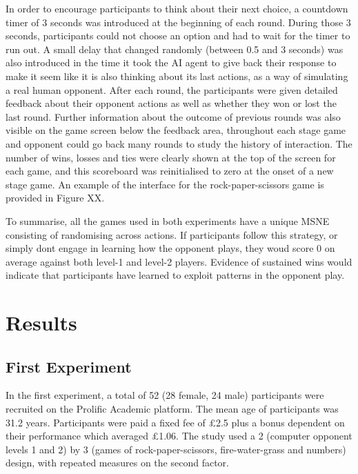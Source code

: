 \documentclass[,man,floatsintext]{apa6}
\begin{document}
In order to encourage participants to think about their next choice, a countdown timer of 3 seconds was introduced at the beginning of each round. During those 3 seconds, participants could not choose an option and had to wait for the timer to run out. A small delay that changed randomly (between 0.5 and 3 seconds) was also introduced in the time it took the AI agent to give back their response to make it seem like it is also thinking about its last actions, as a way of simulating a real human opponent. After each round, the participants were given detailed feedback about their opponent actions as well as whether they won or lost the last round. Further information about the outcome of previous rounds was also visible on the game screen below the feedback area, throughout each stage game and opponent could go back many rounds to study the history of interaction. The number of wins, losses and ties were clearly shown at the top of the screen for each game, and this scoreboard was reinitialised to zero at the onset of a new stage game. An example of the interface for the rock-paper-scissors game is provided in Figure XX.

To summarise, all the games used in both experiments have a unique MSNE consisting of randomising across actions. If participants follow this strategy, or simply dont engage in learning how the opponent plays, they woud score 0 on average against both level-1 and level-2 players. Evidence of sustained wins would indicate that participants have learned to exploit patterns in the opponent play.

\hypertarget{results}{%
\section{Results}\label{results}}

\hypertarget{first-experiment-1}{%
\subsection{First Experiment}\label{first-experiment-1}}

In the first experiment, a total of 52 (28 female, 24 male) participants were recruited on the Prolific Academic platform. The mean age of participants was 31.2 years. Participants were paid a fixed fee of £2.5 plus a bonus dependent on their performance which averaged £1.06. The study used a 2 (computer opponent levels 1 and 2) by 3 (games of rock-paper-scissors, fire-water-grass and numbers) design, with repeated measures on the second factor.
\end{document}
